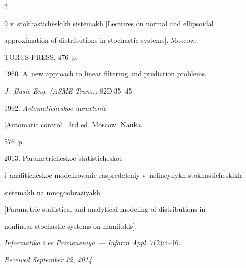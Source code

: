 \begin{multicols}{2}
{{\begin{thebibliography}{9}
v~sto\-kha\-sti\-che\-skikh sistemakh  [Lectures on normal and ellipsoidal

approximation of distributions in stochastic systems]. Moscow:

TORUS PRESS.  476~p.








 1960. A~new approach to linear filtering and prediction problems.

\textit{J.~Basic Eng. (ASME Trans.)} 82D:35--45.




 1992. \textit{Avtomaticheskoe upravlenie}

[Automatic control]. 3rd ed. Moscow: Nauka.

576~p.




 2013. Parametricheskoe statisticheskoe

i~analiticheskoe modelirovanie raspredeleniy v~nelineynykh stokhasticheskikh

sistemakh na mnogoobraziyakh

[Parametric statistical and analytical modeling of distributions in

nonlinear stochastic systems on manifolds].

\textit{Informatika i ee Primeneniya}~--- \textit{Inform Appl.} 7(2):4--16.

\end{thebibliography}



 }

 }



\end{multicols}



\vspace*{-3pt}



\hfill{\small\textit{Received September 22, 2014}}






\Contr



